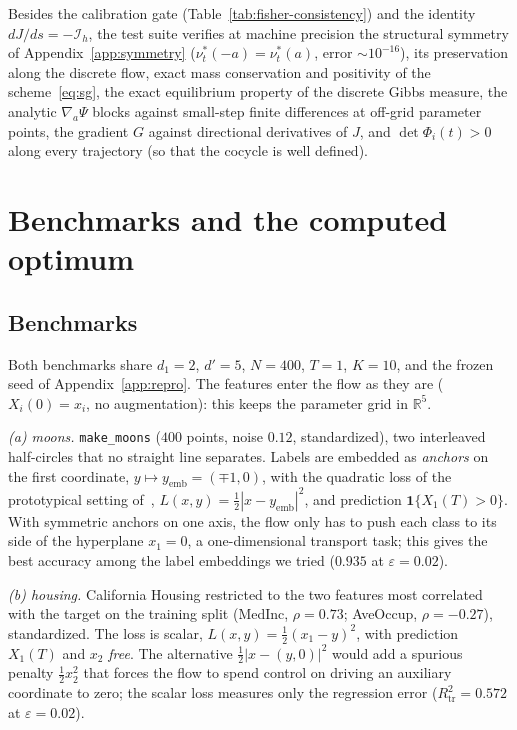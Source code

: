 \documentclass[11pt,leqno]{amsart}
\newcommand{\R}{\mathbb{R}}
\newcommand{\cI}{\mathcal{I}}
\newcommand{\eps}{\varepsilon}
\numberwithin{equation}{section}
\theoremstyle{definition}
\begin{document}
Besides the calibration gate (Table~\ref{tab:fisher-consistency}) and the
identity $dJ/ds=-\cI_h$, the test suite verifies at machine precision the
structural symmetry of Appendix~\ref{app:symmetry}
($\nu^*_t(-a)=\nu^*_t(a)$, error $\sim10^{-16}$), its preservation along the
discrete flow, exact mass conservation and positivity of the
scheme~\eqref{eq:sg}, the exact equilibrium property of the discrete Gibbs
measure, the analytic $\nabla_a\Psi$ blocks against small-step finite
differences at off-grid parameter points, the gradient $G$ against
directional derivatives of $J$, and $\det\Phi_i(t)>0$ along every
trajectory (so that the cocycle is well defined).

\section{Benchmarks and the computed optimum}
\label{sec:optimum}

\subsection{Benchmarks}
\label{sec:benchmarks}
Both benchmarks share $d_1=2$, $d'=5$, $N=400$, $T=1$, $K=10$, and the frozen
seed of Appendix~\ref{app:repro}.  The features enter the flow as they are
($X_i(0)=x_i$, no augmentation): this keeps the parameter grid in $\R^5$.

\emph{(a) moons.}  \texttt{make\_moons} ($400$ points, noise $0.12$,
standardized), two interleaved half-circles that no straight line separates.
Labels are embedded as \emph{anchors} on the first coordinate,
$y\mapsto y_{\mathrm{emb}}=(\mp1,0)$, with the quadratic loss of the
prototypical setting of~\cite{DaudinDelarue2025},
$L(x,y)=\tfrac12|x-y_{\mathrm{emb}}|^2$, and prediction
$\mathbf 1\{X_1(T)>0\}$.  With symmetric anchors on one axis, the flow only
has to push each class to its side of the hyperplane $x_1=0$, a
one-dimensional transport task; this gives the best accuracy among the
label embeddings we tried ($0.935$ at $\eps=0.02$).

\emph{(b) housing.}  California Housing restricted to the two features most
correlated with the target on the training split (MedInc, $\rho=0.73$;
AveOccup, $\rho=-0.27$), standardized.  The loss is scalar,
$L(x,y)=\tfrac12(x_1-y)^2$, with prediction $X_1(T)$ and $x_2$ \emph{free}.
The alternative $\tfrac12|x-(y,0)|^2$ would add a spurious penalty
$\tfrac12x_2^2$ that forces the flow to spend control on driving an
auxiliary coordinate to zero; the scalar loss measures only the regression
error ($R^2_{\mathrm{tr}}=0.572$ at $\eps=0.02$).
\end{document}
